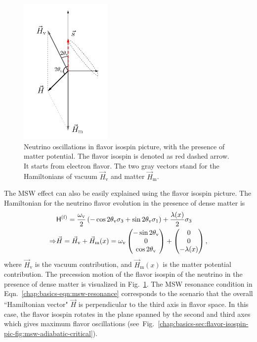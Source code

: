 \begin{figure}[htbp]
    \centering
    \includegraphics[width=0.4\textwidth]{chapters/assets/matter/matter-effect-notsolarge-density}
    \caption{Neutrino oscillations in flavor isospin picture, with the presence of matter potential. The flavor isospin is denoted as red dashed arrow. It starts from electron flavor. The two gray vectors stand for the Hamiltonians of vacuum $\vec H_{\mathrm v}$ and matter $\vec H_{\mathrm m}$.}
    \label{chap:basics-sec:flavor-isospin-pic-fig:matter-effect-notsolarge-density}
\end{figure}

The MSW effect can also be easily explained using the flavor isospin picture. The Hamiltonian for the neutrino flavor evolution in the presence of dense matter is
\begin{align*}
    &\mathsf H^{(\mathrm f)} =  \frac{\omega_{\mathrm{v}}}{2}\left( - \cos 2\theta_{\mathrm{v}} {\sigma_3} + \sin 2\theta_{\mathrm{v}} {\sigma_1} \right)   + \frac{\lambda(x)}{2} {\sigma_3} \\
    \Rightarrow &\vec H =  \vec H_{\mathrm v} + \vec H_{\mathrm m}(x)
     = \omega_{\mathrm v}\begin{pmatrix}
    - \sin 2\theta_{\mathrm v} \\
    0 \\
    \cos 2\theta_{\mathrm v}
    \end{pmatrix}   + \begin{pmatrix}
    0\\
    0\\
    - \lambda(x)
    \end{pmatrix}  ,
\end{align*}
where $\vec H_{\mathrm v}$ is the vacuum contribution, and $\vec H_{\mathrm m}(x)$ is the matter potential contribution. The precession motion of the flavor isospin of the neutrino in the presence of dense matter is visualized in Fig.~\ref{chap:basics-sec:flavor-isospin-pic-fig:matter-effect-notsolarge-density}. The MSW resonance condition in Eqn.~\ref{chap:basics-eqn:msw-resonance} corresponds to the scenario that the overall ``Hamiltonian vector" $\vec H$ is perpendicular to the third axis in flavor space. In this case, the flavor isospin rotates in the plane spanned by the second and third axes which gives maximum flavor oscillations (see~Fig.~\ref{chap:basics-sec:flavor-isospin-pic-fig:msw-adiabatic-critical}).

